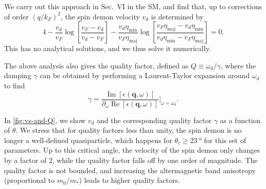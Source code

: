 \documentclass[aps,prl,reprint,twocolumns,superscriptaddress]{revtex4-2}
\newcommand{\deltaq}{\eta_{{\mathrm{min}}}(\theta)/\eta_{{\mathrm{maj}}}(\theta)}
\DeclareMathOperator{\Imm}{Im}
\DeclareMathOperator{\Ree}{Re}
\newcommand{\kF}{k_{F}}
\newcommand{\vs}{v_d}
\begin{document}
	We carry out this approach in Sec.~VI in the SM, and find that, up to corrections of order $(q/\kF)^2$, the spin demon velocity $\vs$ is determined by 
	\begin{equation}
		4 -\frac{\vs}{v_F} \log\left[\frac{v_F-\vs}{\vs-v_F}\right] - \frac{\vs\eta_{{\mathrm{min}}}}{v_F\eta_{{\mathrm{maj}}}} \log\left[\frac{v_F\eta_{{\mathrm{maj}}}-\vs\eta_{{\mathrm{min}}}}{\vs\eta_{{\mathrm{min}}}-v_F\eta_{{\mathrm{maj}}}}\right] = 0. \label{eq:zeros-vs}
	\end{equation}
	This has no analytical solutions, and we thus solve it numerically.
	
	
	
	
	
	The above analysis also gives the quality factor, defined as $Q \equiv \omega_d / \gamma$, where the damping $\gamma$ can be obtained by performing a Laurent-Taylor expansion around $\omega_d$ to find 
	\begin{equation}
		\gamma = \frac{\Imm[\epsilon(\bm q,\omega)]}{\partial_\omega \Ree[\epsilon(\bm q,\omega)]}\Bigr|_{\omega=\omega_d}.
	\end{equation}
	
	
	In \cref{fig:vs-and-Q}, we show $\vs$ and the corresponding quality factor $\gamma$ as a function of $\theta$. We stress that for quality factors less than unity, the spin demon is no longer a well-defined quasiparticle, which happens for $\theta_c\ge\SI{23}{\degree}$ for this set of parameters. Up to this critical angle, the velocity of the spin demon only changes by a factor of 2, while the quality factor falls off by one order of magnitude. The quality factor is not bounded, and increasing the altermagnetic band anisotropy (proportional to $m_0/m_*$) leads to higher quality factors.
	
	
\end{document}
